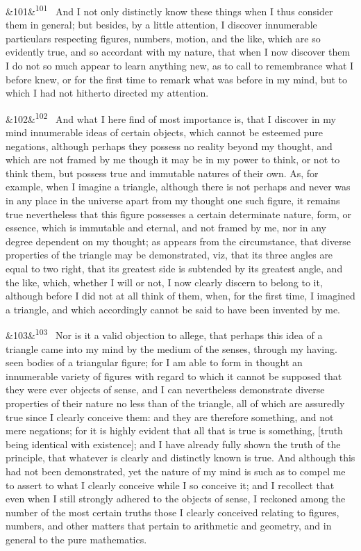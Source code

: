 \documentclass[12pt]{article}
\newcommand{\para}[1][]{\par\noindent\ifx&#1&\else\textsuperscript{\footnotesize #1}~\fi}
\begin{document}
\para[101] And I not only distinctly know these things when I thus consider them in general; but besides, by a little attention, I discover innumerable particulars respecting figures, numbers, motion, and the like, which are so evidently true, and so accordant with my nature, that when I now discover them I do not so much appear to learn anything new, as to call to remembrance what I before knew, or for the first time to remark what was before in my mind, but to which I had not hitherto directed my attention.

\para[102] And what I here find of most importance is, that I discover in my mind innumerable ideas of certain objects, which cannot be esteemed pure negations, although perhaps they possess no reality beyond my thought, and which are not framed by me though it may be in my power to think, or not to think them, but possess true and immutable natures of their own. As, for example, when I imagine a triangle, although there is not perhaps and never was in any place in the universe apart from my thought one such figure, it remains true nevertheless that this figure possesses a certain determinate nature, form, or essence, which is immutable and eternal, and not framed by me, nor in any degree dependent on my thought; as appears from the circumstance, that diverse properties of the triangle may be demonstrated, viz, that its three angles are equal to two right, that its greatest side is subtended by its greatest angle, and the like, which, whether I will or not, I now clearly discern to belong to it, although before I did not at all think of them, when, for the first time, I imagined a triangle, and which accordingly cannot be said to have been invented by me.

\para[103] Nor is it a valid objection to allege, that perhaps this idea of a triangle came into my mind by the medium of the senses, through my having. seen bodies of a triangular figure; for I am able to form in thought an innumerable variety of figures with regard to which it cannot be supposed that they were ever objects of sense, and I can nevertheless demonstrate diverse properties of their nature no less than of the triangle, all of which are assuredly true since I clearly conceive them: and they are therefore something, and not mere negations; for it is highly evident that all that is true is something, [truth being identical with existence]; and I have already fully shown the truth of the principle, that whatever is clearly and distinctly known is true. And although this had not been demonstrated, yet the nature of my mind is such as to compel me to assert to what I clearly conceive while I so conceive it; and I recollect that even when I still strongly adhered to the objects of sense, I reckoned among the number of the most certain truths those I clearly conceived relating to figures, numbers, and other matters that pertain to arithmetic and geometry, and in general to the pure mathematics.
\end{document}
